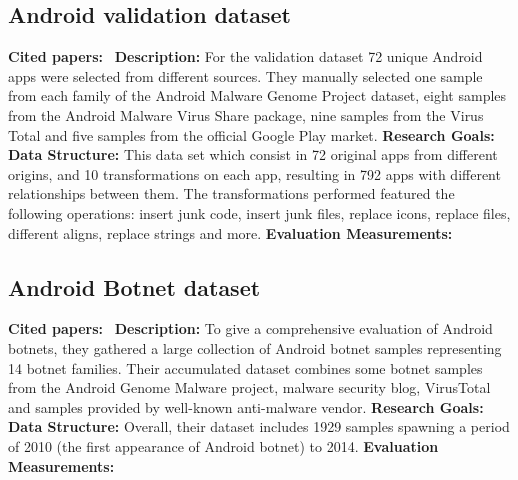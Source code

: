 \subsection{Android validation dataset}
\textbf{Cited papers:}~\cite{gonzalez2014droidkin} \newline
\textbf{Description:} For the validation dataset 72 unique Android apps were selected from different sources. They manually selected one sample from each family of the Android Malware Genome Project dataset, eight samples from the Android Malware Virus Share package, nine samples from the Virus Total and five samples from the official Google Play market. \newline
\textbf{Research Goals:}  \newline
\textbf{Data Structure:} This data set which consist in 72 original apps from different origins, and 10 transformations on each app, resulting in 792 apps with different relationships between them. The transformations performed featured the following operations: insert junk code, insert junk files, replace icons, replace files, different aligns, replace strings and more.\newline
\textbf{Evaluation Measurements:} \newline




\subsection{Android Botnet dataset}
\textbf{Cited papers:}~\cite{kadir2015android} \newline
\textbf{Description:} To give a comprehensive evaluation of Android botnets, they gathered a large collection of Android botnet samples representing 14 botnet families. Their accumulated dataset combines some botnet samples from the Android Genome Malware project, malware security blog, VirusTotal and samples provided by well-known anti-malware vendor. \newline
\textbf{Research Goals:}  \newline
\textbf{Data Structure:} Overall, their dataset includes 1929 samples spawning a period of 2010 (the first appearance of Android botnet) to 2014.\newline
\textbf{Evaluation Measurements:} \newline





